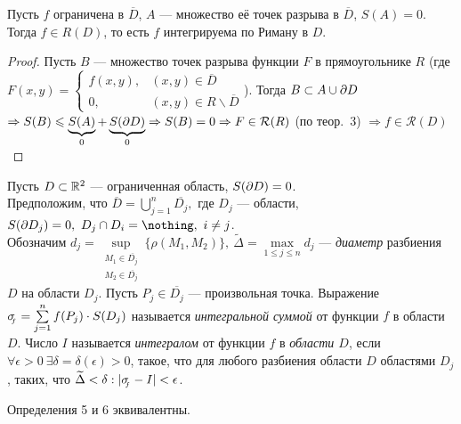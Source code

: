 \documentclass[a4paper,10pt]{article}
\begin{document}
	\begin{thm}
		Пусть $f$ ограничена в $\overline{D}$, $A$ --- множество её точек разрыва в $\overline{D}$, $S(A) = 0$. Тогда $f \in R(D)$, то есть $f$ интегрируема по Риману в $D$.
	\end{thm}
	
	\begin{proof}
		Пусть $B$ --- множество точек разрыва функции $F$ в прямоугольнике $R$ \Bigg(где $F(x, y) = \begin{cases} f(x, y), & (x, y) \in \overline{D} \\ 0, & (x, y) \in R \backslash \overline{D} \end{cases}$\Bigg). Тогда $B \subset A \cup \partial D$\\
		$\Rightarrow S(B) \leqslant \underbrace{S(A)}_{0} + \underbrace{S(\partial D)}_{0}\Rightarrow S(B) = 0 \Rightarrow F\in\mathcal{R}(R)$ (по теор.~3) $\Rightarrow f\in \mathcal{R}(D)$  
	\end{proof}
	
	\begin{defn}
		Пусть $D \subset {\mathbb R}^2$ --- ограниченная область, $S(\partial D) = 0$. \\ Предположим, что $\overline{D} = \bigcup\limits_{j = 1}^n \overline{D_j},$ где $D_j$ --- области, $S(\d D_j) = 0, ~ D_j \cap D_i = \nothing,~i \neq j$.\\
		Обозначим $d_j = \!\!\!\! \sup\limits_{\begin{smallmatrix} M_1 \in \overline{D_j} \\ M_2 \in \overline{D_j} \end{smallmatrix}} \!\!\! \{ \rho(M_1, M_2) \},~\widetilde{\Delta} = \! \max\limits_{1 \le j \le n} \! d_j$ --- \textit{диаметр} разбиения $D$ на области $D_j$.
		Пусть $P_j \in \overline{D_j}$ --- произвольная точка. Выражение $\sigma_{\!\!{}_f} = \sum\limits_{j = 1}^n f(P_j) \cdot S(D_j)$ называется \textit{интегральной суммой} от функции $f$ в области $D$. Число $I$ называется \textit{интегралом} от функции $f$ в \textit{области $D$}, если $\forall \epsilon > 0 ~ \exists \delta = \delta(\epsilon) > 0$, такое, что для любого разбиения области $D$ областями $D_j$, таких, что $\widetilde{\Delta} < \delta:|\sigma_{\!\!{}_f} - I| < \epsilon$.
	\end{defn}
	
	\begin{thm*}
		Определения 5 и 6 эквивалентны.
	\end{thm*}
	
\end{document}
